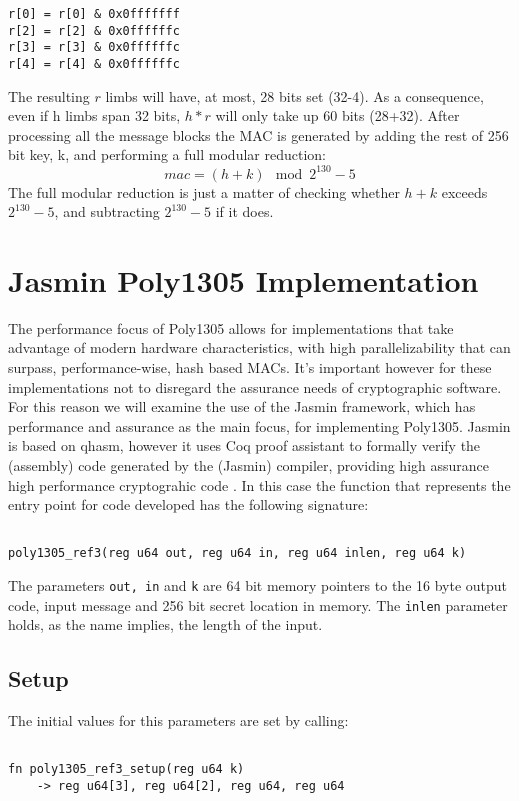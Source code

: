 \documentclass{article}
\begin{document}
\begin{Verbatim}
r[0] = r[0] & 0x0fffffff
r[2] = r[2] & 0x0ffffffc
r[3] = r[3] & 0x0ffffffc
r[4] = r[4] & 0x0ffffffc
\end{Verbatim}

The resulting $r$ limbs will have, at most, 28 bits set (32-4). As a consequence, even if h limbs span 32 bits, $h*r$ will only take up 60 bits (28+32).
After processing all the message blocks the MAC is generated by adding the rest of 256 bit key, k, and performing a full modular reduction:
$$mac = (h+k) \mod{2^{130}-5} $$
\newline
The full modular reduction is just a matter of checking whether $h+k$ exceeds $2^{130}-5$, and subtracting $2^{130}-5$ if it does.

\section{Jasmin Poly1305 Implementation}
The performance focus of Poly1305 allows for implementations that take advantage of modern hardware characteristics, with high parallelizability that can surpass, 
performance-wise, hash based MACs. It's important however for these implementations not to disregard the assurance needs of cryptographic software. For this 
reason we will examine the use of the Jasmin framework, which has performance and assurance as the main focus, for implementing Poly1305. Jasmin is based on qhasm, 
however it uses Coq proof assistant to formally verify the (assembly) code generated by the (Jasmin) compiler, providing high assurance high performance 
cryptograhic code \cite{jasmin_paper}. In this case the function that represents the entry point for code developed has the following signature: 

\begin{Verbatim}

poly1305_ref3(reg u64 out, reg u64 in, reg u64 inlen, reg u64 k)

\end{Verbatim}

The parameters \texttt{out, in} and \texttt{k} are 64 bit memory pointers to the 16 byte output code, input message and 256 bit secret location in memory. The 
\texttt{inlen} parameter holds, as the name implies, the length of the input.

\subsection{Setup}
The initial values for this parameters are set by calling:
\begin{Verbatim}

fn poly1305_ref3_setup(reg u64 k) 
    -> reg u64[3], reg u64[2], reg u64, reg u64

\end{Verbatim}
\end{document}
